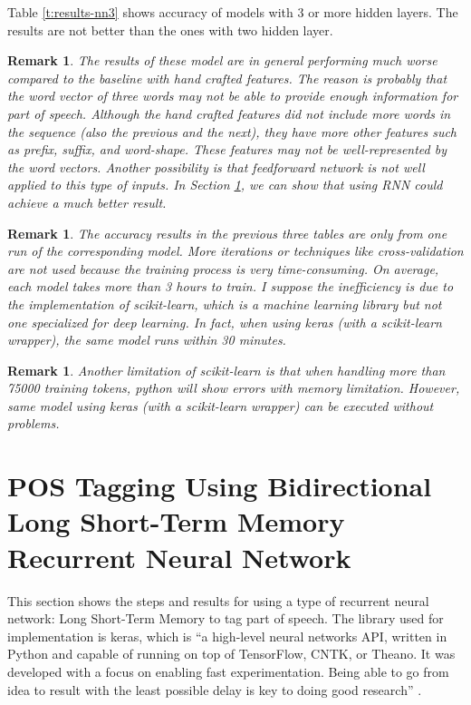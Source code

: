 \documentclass[11pt]{article}
\theoremstyle{plain}
\newtheorem{remark}[theorem]{Remark}
\begin{document}
Table \ref{t:results-nn3} shows accuracy of models with 3 or more hidden 
layers. The results are not better than the ones with two hidden layer. 

\begin{remark}
	The results of these model are in general performing much worse 
	compared to the baseline with hand crafted features. The reason is 
	probably that the word vector of three words may not be able to provide 
	enough information for part of speech. Although the hand crafted 
	features did not include more words in the sequence (also the previous 
	and the next), they have more other features such as prefix, suffix, and  
	word-shape. These features may not be well-represented by the word 
	vectors. Another possibility is that feedforward network is not well applied 
	to this type of inputs. In Section \ref{s:LSTM}, we can show that using 
	RNN could achieve a much better result. 
\end{remark}

\begin{remark}
	The accuracy results in the previous three tables are only from one run of 
	the corresponding model. More iterations or techniques like 
	cross-validation are not used because the training process is very 
	time-consuming. On average, each model takes more than 3 hours to 
	train. I suppose the inefficiency is due to the implementation of 
	scikit-learn, which is a machine learning library but not one specialized for 
	deep learning. In fact, when using keras (with a scikit-learn wrapper), the 
	same model runs within 30 minutes. 
\end{remark}

\begin{remark}
	Another limitation of scikit-learn is that when handling more than 75000 
	training tokens, python will show errors with memory limitation. However, 
	same model using keras (with a scikit-learn wrapper) can be executed 
	without problems.
\end{remark}


\section[POS Using BLSTM-RNN in Keras]{POS Tagging Using Bidirectional 
Long Short-Term Memory Recurrent Neural Network }
\label{s:LSTM}
This section shows the steps and results for using a type of recurrent neural 
network: Long Short-Term Memory to tag part of speech. The library used 
for implementation is keras, which is ``a high-level neural networks API, 
written in Python and capable of running on top of TensorFlow, CNTK, or 
Theano. It was developed with a focus on enabling fast experimentation. 
Being able to go from idea to result with the least possible delay is key to 
doing good research'' \cite{keras-doc}.
\end{document}
